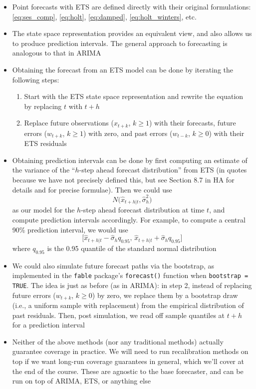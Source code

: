 \documentclass{article}
\begin{document}
\begin{itemize}
\item Point forecasts with ETS are defined directly with their original
  formulations: \eqref{eq:ses_comp}, \eqref{eq:holt}, \eqref{eq:damped}, 
  \eqref{eq:holt_winters}, etc.

\item The state space representation provides an equivalent view, and also
  allows us to produce prediction intervals. The general approach to forecasting
  is analogous to that in ARIMA

\item Obtaining the forecast  from an ETS model can
  be done by iterating the following steps:  

\begin{enumerate}
\item Start with the ETS state space representation and rewrite the equation by
  replacing $t$ with $t+h$

\item Replace future observations ($x_{t+k}$, $k \geq 1$) with their forecasts,
  future errors ($w_{t+k}$, $k \geq 1$) with zero, and past errors ($w_{t-k}$,
  $k \geq 0$) with their ETS residuals   
\end{enumerate}

\item Obtaining prediction intervals can be done by first computing an estimate
   of the variance of the ``$h$-step ahead forecast
  distribution'' from ETS (in quotes because we have not precisely defined this,
  but see Section 8.7 in HA for details and for precise formulae). Then we could
  use  
  \[
  N\big( \hat{x}_{t+h | t}, \hat\sigma^2_h \big)
  \]
  as our model for the $h$-step ahead forecast distribution at time $t$, and
  compute prediction intervals accordingly. For example, to compute a
  central 90\% prediction interval, we would use 
  \[
  \big[\hat{x}_{t+h | t} - \hat\sigma_h q_{0.95}, \, \hat{x}_{t+h | t} +  
  \hat\sigma_h q_{0.95} \big]
  \]
  where $q_{0.95}$ is the 0.95 quantile of the standard normal distribution

\item We could also simulate future forecast paths via the bootstrap, as
  implemented in the \verb|fable| package's \verb|forecast()| function when 
  \verb|bootstrap = TRUE|. The idea is just as before (as in ARIMA): in step 2,
  instead of replacing future errors ($w_{t+k}$, $k \geq 0$) by zero, we replace
  them by a bootstrap draw (i.e., a uniform sample with replacement) from the
  empirical distribution of past residuals. Then, post simulation, we read off
  sample quantiles at $t+h$ for a prediction interval     

\item Neither of the above methods (nor any traditional methods) actually
  guarantee coverage in practice. We will need to run recalibration methods on
  top if we want long-run coverage guarantees in general, which we'll cover at
  the end of the course. These are agnostic to the base forecaster, and can be
  run on top of ARIMA, ETS, or anything else
\end{itemize}
\end{document}
